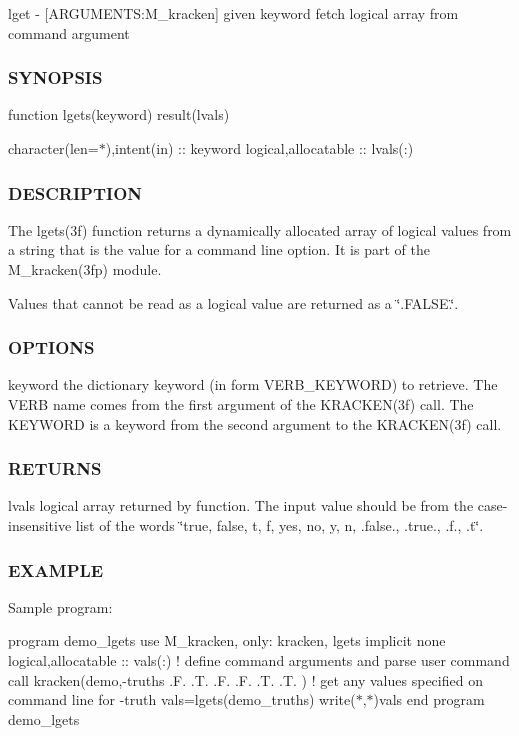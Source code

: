 lget -\/ \mbox{[}A\+R\+G\+U\+M\+E\+N\+TS\+:M\+\_\+kracken\mbox{]} given keyword fetch logical array from command argument \subsubsection*{S\+Y\+N\+O\+P\+S\+IS}

function lgets(keyword) result(lvals)

character(len=$\ast$),intent(in) \+:\+: keyword logical,allocatable \+:\+: lvals(\+:) \subsubsection*{D\+E\+S\+C\+R\+I\+P\+T\+I\+ON}

The lgets(3f) function returns a dynamically allocated array of logical values from a string that is the value for a command line option. It is part of the M\+\_\+kracken(3fp) module.

Values that cannot be read as a logical value are returned as a \char`\"{}.\+F\+A\+L\+S\+E.\char`\"{}. \subsubsection*{O\+P\+T\+I\+O\+NS}

keyword the dictionary keyword (in form V\+E\+R\+B\+\_\+\+K\+E\+Y\+W\+O\+RD) to retrieve. The V\+E\+RB name comes from the first argument of the K\+R\+A\+C\+K\+E\+N(3f) call. The K\+E\+Y\+W\+O\+RD is a keyword from the second argument to the K\+R\+A\+C\+K\+E\+N(3f) call.

\subsubsection*{R\+E\+T\+U\+R\+NS}

lvals logical array returned by function. The input value should be from the case-\/insensitive list of the words \char`\"{}true, false,
                t, f, yes, no, y, n, .\+false., .\+true., .\+f., .\+t\char`\"{}.

\subsubsection*{E\+X\+A\+M\+P\+LE}

Sample program\+:

program demo\+\_\+lgets use M\+\_\+kracken, only\+: kracken, lgets implicit none logical,allocatable \+:\+: vals(\+:) ! define command arguments and parse user command call kracken(\textquotesingle{}demo\textquotesingle{},\textquotesingle{}-\/truths .F. .T. .F. .F. .T. .T.\textquotesingle{} ) ! get any values specified on command line for -\/truth vals=lgets(\textquotesingle{}demo\+\_\+truths\textquotesingle{}) write($\ast$,$\ast$)vals end program demo\+\_\+lgets


